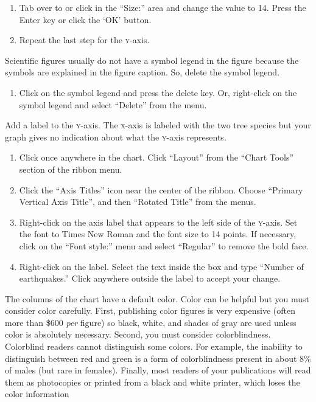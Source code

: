\documentclass[12pt, hidelinks]{exam}
\newcommand*\axis[1]{{\scshape #1}-axis}
\begin{document}
\begin{questions}
\begin{enumerate}[resume]
	\item Tab over to or click in the “Size:” area and change the value to 14. Press the Enter key or click the ‘OK’ button.
	
	\item Repeat the last step for the \axis{y}.
\end{enumerate}

Scientific figures usually do not have a symbol legend in the figure because the symbols are explained in the figure caption. So, delete the symbol legend.  

\begin{enumerate}[resume]
	\item Click on the symbol legend and press the delete key. Or, right-click on the symbol legend and select “Delete” from the menu.
\end{enumerate}

Add a label to the \axis{y}. The \axis{x} is labeled with the two tree species but your graph gives no indication about what the \axis{y} represents.

\begin{enumerate}[resume]
	\item Click once anywhere in the chart. Click “Layout” from the “Chart Tools” section of the ribbon menu. 
	
	\item Click the “Axis Titles” icon near the center of the ribbon. Choose “Primary Vertical Axis Title”, and then “Rotated Title” from the menus.
	
	\item Right-click on the axis label that appears to the left side of the \axis{y}. Set the font to Times New Roman and the font size to 14 points. If necessary, click on the “Font style:” menu and select “Regular” to remove the bold face.
	
	\item Right-click on the label. Select the text inside the box and type “Number of earthquakes.” Click anywhere outside the label to accept your change.
\end{enumerate}

The columns of the chart have a default color. Color can be helpful but you must consider color carefully. First, publishing color figures is very expensive (often more than \$600 \emph{per} figure) so black, white, and shades of gray are used unless color is absolutely necessary. Second, you must consider colorblindness. Colorblind readers cannot distinguish some colors. For example, the inability to distinguish between red and green is a form of colorblindness present in about 8\% of males (but rare in females). Finally, most readers
of your publications will read them as photocopies or printed from
a black and white printer, which loses the color information


\end{questions}
\end{document}
